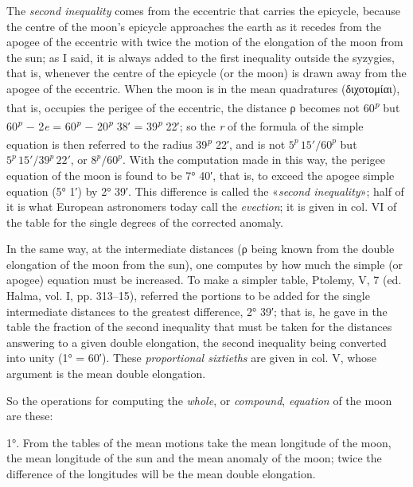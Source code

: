 \documentclass[11pt]{article}
\begin{document}
\par The \emph{second inequality} comes from the eccentric that carries the epicycle, because the centre of the moon's epicycle approaches the earth as it recedes from the apogee of the eccentric with twice the motion of the elongation of the moon from the sun; as I said, it is always added to the first inequality outside the syzygies, that is, whenever the centre of the epicycle (or the moon) is drawn away from the apogee of the eccentric. When the moon is in the mean quadratures ({\greekfont διχοτομίαι}), that is, occupies the perigee of the eccentric, the distance {\greekfont ρ} becomes not 60\textsuperscript{\itshape p} but 60\textsuperscript{\itshape p} − 2\emph{e} = 60\textsuperscript{\itshape p} − 20\textsuperscript{\itshape p} 38′ = 39\textsuperscript{\itshape p} 22′; so the \emph{r} of the formula of the simple equation is then referred to the radius 39\textsuperscript{\itshape p} 22′, and is not $5^{p}\,15'/60^{p}$ but $5^{p}\,15'/39^{p}\,22'$, or $8^{p}/60^{p}$. With the computation made in this way, the perigee equation of the moon is found to be 7° 40′, that is, to exceed the apogee simple equation (5° 1′) by 2° 39′. This difference is called the «\emph{second inequality}»; half of it is what European astronomers today call the \emph{evection}; it is given in col. VI of the table for the single degrees of the corrected anomaly.\par
\par In the same way, at the intermediate distances ({\greekfont ρ} being known from the double elongation of the moon from the sun), one computes by how much the simple (or apogee) equation must be increased. To make a simpler table, Ptolemy, V, 7 (ed. Halma, vol. I, pp. 313–15), referred the portions to be added for the single intermediate distances to the greatest difference, 2° 39′; that is, he gave in the table the fraction of the second inequality that must be taken for the distances answering to a given double elongation, the second inequality being converted into unity (1° = 60′). These \emph{proportional sixtieths} are given in col. V, whose argument is the mean double elongation.\par
\par So the operations for computing the \emph{whole}, or \emph{compound}, \emph{equation} of the moon are these:\par
\par 1°. From the tables of the mean motions take the mean longitude of the moon, the mean longitude of the sun and the mean anomaly of the moon; twice the difference of the longitudes will be the mean double elongation.\par
\end{document}
